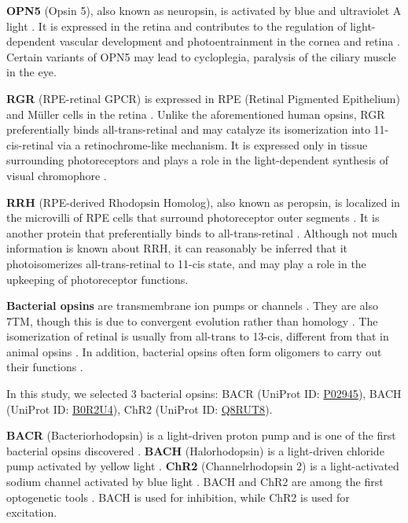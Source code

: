 \documentclass[fleqn, 10pt, lineno]{manuscript}
\begin{document}
\textbf{OPN5} (Opsin 5), also known as neuropsin, is activated by blue and ultraviolet A light \citep{Tarttelin_2003}. It is expressed in the retina and contributes to the regulation of light-dependent vascular development and photoentrainment in the cornea and retina \citep{Buhr_2015}. Certain variants of OPN5 may lead to cycloplegia, paralysis of the ciliary muscle in the eye. 

\textbf{RGR} (RPE-retinal GPCR) is expressed in RPE (Retinal Pigmented Epithelium) and M\"uller cells in the retina \citep{Shen_1994}. Unlike the aforementioned human opsins, RGR preferentially binds all-trans-retinal and may catalyze its isomerization into 11-cis-retinal via a retinochrome-like mechanism. It is expressed only in tissue surrounding photoreceptors and plays a role in the light-dependent synthesis of visual chromophore \citep{Radu_2008}.

\textbf{RRH} (RPE-derived Rhodopsin Homolog), also known as peropsin, is localized in the microvilli of RPE cells that surround photoreceptor outer segments \citep{Sun_1997}. It is another protein that preferentially binds to all-trans-retinal \citep{Cook_2017}. Although not much information is known about RRH, it can reasonably be inferred that it photoisomerizes all-trans-retinal to 11-cis state, and may play a role in the upkeeping of photoreceptor functions. 

\textbf{Bacterial opsins} are transmembrane ion pumps or channels \citep{Findlay_1986, Zhang_2011}. They are also 7TM, though this is due to convergent evolution rather than homology \citep{Yee_2013}. The isomerization of retinal is usually from all-trans to 13-cis, different from that in animal opsins \citep{Findlay_1986}. In addition, bacterial opsins often form oligomers to carry out their functions \citep{Gmelin_2007}.

In this study, we selected 3 bacterial opsins: BACR (UniProt ID: \href{https://www.uniprot.org/uniprotkb/P02945/entry}{P02945}), BACH (UniProt ID: \href{https://www.uniprot.org/uniprotkb/B0R2U4/entry}{B0R2U4}), ChR2 (UniProt ID: \href{https://www.uniprot.org/uniprotkb/Q8RUT8/entry}{Q8RUT8}). 

\textbf{BACR} (Bacteriorhodopsin) is a light-driven proton pump and is one of the first bacterial opsins discovered \citep{Oesterhelt_1971}. \textbf{BACH} (Halorhodopsin) is a light-driven chloride pump activated by yellow light \citep{Schobert_1982}. \textbf{ChR2} (Channelrhodopsin 2) is a light-activated sodium channel activated by blue light \citep{Nagel_2003}. BACH and ChR2 are among the first optogenetic tools \citep{Zhang_2007, Han_2007}. BACH is used for inhibition, while ChR2 is used for excitation. 
\end{document}

